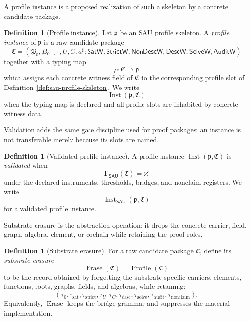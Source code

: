 \documentclass[11pt]{article}
\newcommand{\SAU}{\mathsf{SAU}}
\newcommand{\Prof}{\operatorname{Profile}}
\newcommand{\Inst}{\operatorname{Inst}}
\newcommand{\Erase}{\operatorname{Erase}}
\theoremstyle{definition}
\newtheorem{definition}[theorem]{Definition}
\begin{document}
A profile instance is a proposed realization of such a skeleton by a concrete
candidate package.

\begin{definition}[Profile instance]
\label{def:sau-profile-instance}
Let \(\mathfrak p\) be an SAU profile skeleton.  A \emph{profile instance} of \(\mathfrak p\) is a raw candidate package
\[
\mathfrak C=(\mathfrak P_0,B_{0\to1},U,C,a^\sharp;
\mathsf{SatW},\mathsf{StrictW},\mathsf{NonDescW},\mathsf{DescW},\mathsf{SolveW},\mathsf{AuditW})
\]
together with a typing map
\[
\rho:\mathfrak C\longrightarrow\mathfrak p
\]
which assigns each concrete witness field of \(\mathfrak C\) to the corresponding profile slot of Definition~\ref{def:sau-profile-skeleton}.  We write
\[
\Inst(\mathfrak p,\mathfrak C)
\]
when the typing map is declared and all profile slots are inhabited by concrete witness data.
\end{definition}

Validation adds the same gate discipline used for proof packages: an instance is
not transferable merely because its slots are named.

\begin{definition}[Validated profile instance]
\label{def:sau-validated-profile-instance}
A profile instance \(\Inst(\mathfrak p,\mathfrak C)\) is \emph{validated} when
\[
\mathbf F_{\SAU}(\mathfrak C)=\varnothing
\]
under the declared instruments, thresholds, bridges, and nonclaim registers.  We write
\[
\Inst_{\SAU}(\mathfrak p,\mathfrak C)
\]
for a validated profile instance.
\end{definition}

Substrate erasure is the abstraction operation: it drops the concrete carrier,
field, graph, algebra, element, or cochain while retaining the proof roles.

\begin{definition}[Substrate erasure]
\label{def:sau-substrate-erasure}
For a raw candidate package \(\mathfrak C\), define its \emph{substrate erasure}
\[
\Erase(\mathfrak C)=\Prof(\mathfrak C)
\]
to be the record obtained by forgetting the substrate-specific carriers, elements, functions, roots, graphs, fields, and algebras, while retaining:
\[
(\tau_{0},\tau_{\mathrm{sat}},\tau_{\mathrm{strict}},
\tau_U,\tau_C,\tau_{\mathrm{desc}},\tau_{\mathrm{solve}},
\tau_{\mathrm{audit}},\tau_{\mathrm{nonclaim}}).
\]
Equivalently, \(\Erase\) keeps the bridge grammar and suppresses the material implementation.
\end{definition}
\end{document}
